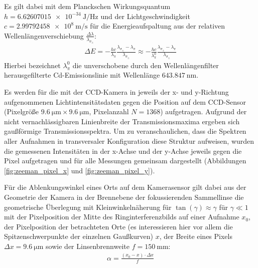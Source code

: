 Es gilt dabei mit dem Planckschen Wirkungsquantum $h=\SI{6.62607015e-34}{\joule\per\hertz}$ und der Lichtgeschwindigkeit $c=\SI{2.99792458e8}{\meter\per\second}$ \cite{KonstantenNIST} für die Energieaufspaltung aus der relativen Wellenlängenverschiebung $\frac{\Delta \lambda}{\lambda_{\sigma_\pm}}$\cite[9]{Versuchsanleitung401}:
\begin{align}\label{eq:energieformel}
	\Delta E = -\frac{h c}{\lambda_\pi}\frac{\lambda_{\sigma_\pm}-\lambda_\pi}{\lambda_{\sigma_\pm}} \approx -\frac{h c}{\lambda_\pi^0}\frac{\lambda_{\sigma_\pm}-\lambda_\pi}{\lambda_{\sigma_\pm}}
\end{align}
Hierbei bezeichnet $\lambda_\pi^0$ die unverschobene durch den Wellenlängenfilter herausgefilterte Cd-Emissionslinie mit Wellenlänge $\SI{643.847}{\nano\meter}$.

Es werden für die mit der CCD-Kamera in jeweils der x- und y-Richtung aufgenommenen Lichtintensitätsdaten gegen die Position auf dem CCD-Sensor (Pixelgröße $\SI{9.6}{\micro\meter}\times\SI{9.6}{\micro\meter}$, Pixelanzahl $N=1368$\cite[5]{Versuchsanleitung401}) aufgetragen. Aufgrund der nicht vernachlässigbaren Linienbreite der Transmissionsmaxima ergeben sich gaußförmige Transmissionsspektra. Um zu veranschaulichen, dass die Spektren aller Aufnahmen in transversaler Konfiguration diese Struktur aufweisen, wurden die gemessenen Intensitäten in der x-Achse und der y-Achse jeweils gegen die Pixel aufgetragen und für alle Messungen gemeinsam dargestellt (Abbildungen \ref{fig:zeeman_pixel_x} und \ref{fig:zeeman_pixel_y}).


Für die Ablenkungswinkel eines Orts auf dem Kamerasensor gilt dabei aus der Geometrie der Kamera in der Brennebene der fokussierenden Sammellinse die geometrische Überlegung mit Kleinwinkelnäherung für $\tan(\gamma)\approx \gamma$ für $\gamma \ll 1$  mit der Pixelposition der Mitte des Ringinterferenzbilds auf einer Aufnahme $x_0$, der Pixelposition der betrachteten Orte (es interessieren hier vor allem die Spitzenschwerpunkte der einzelnen Gaußkurven) $x$, der Breite eines Pixels $\Delta x = \SI{9.6}{\micro\meter}$ sowie der Linsenbrennweite $f=\SI{150}{\milli\meter}$:
\begin{align} \label{eq:winkel}
	\alpha = \frac{(x_0-x)\cdot \Delta x}{f}
\end{align}

